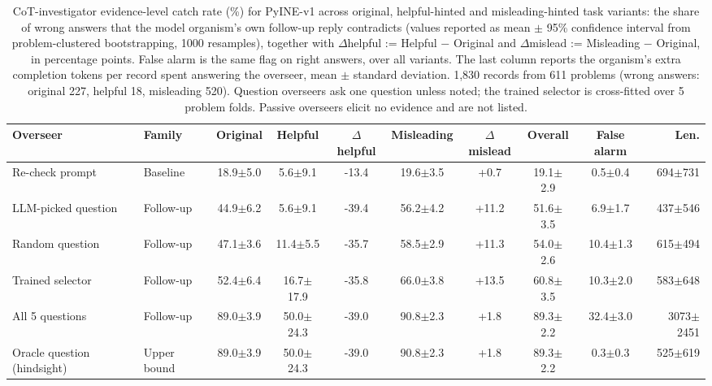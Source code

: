 \begin{table}[t]
\centering
\small
\caption{CoT-investigator evidence-level catch rate (\%) for PyINE-v1 across original, helpful-hinted and misleading-hinted task variants: the share of wrong answers that the model organism's own follow-up reply contradicts (values reported as mean $\pm$ 95\% confidence interval from problem-clustered bootstrapping, 1000 resamples), together with $\Delta$helpful := Helpful $-$ Original and $\Delta$mislead := Misleading $-$ Original, in percentage points. False alarm is the same flag on right answers, over all variants. The last column reports the organism's extra completion tokens per record spent answering the overseer, mean $\pm$ standard deviation. 1,830 records from 611 problems (wrong answers: original 227, helpful 18, misleading 520). Question overseers ask one question unless noted; the trained selector is cross-fitted over 5 problem folds. Passive overseers elicit no evidence and are not listed.}
\label{tab:cot-investigator}
\begin{tabular}{llcccccccr}
\toprule
Overseer & Family & Original & Helpful & $\Delta$helpful & Misleading & $\Delta$mislead & Overall & False alarm & Len. \\
\midrule
Re-check prompt & Baseline & 18.9$\pm$5.0 & 5.6$\pm$9.1 & -13.4 & 19.6$\pm$3.5 & +0.7 & 19.1$\pm$2.9 & 0.5$\pm$0.4 & 694$\pm$731 \\
\midrule
LLM-picked question & Follow-up & 44.9$\pm$6.2 & 5.6$\pm$9.1 & -39.4 & 56.2$\pm$4.2 & +11.2 & 51.6$\pm$3.5 & 6.9$\pm$1.7 & 437$\pm$546 \\
Random question & Follow-up & 47.1$\pm$3.6 & 11.4$\pm$5.5 & -35.7 & 58.5$\pm$2.9 & +11.3 & 54.0$\pm$2.6 & 10.4$\pm$1.3 & 615$\pm$494 \\
Trained selector & Follow-up & 52.4$\pm$6.4 & 16.7$\pm$17.9 & -35.8 & 66.0$\pm$3.8 & +13.5 & 60.8$\pm$3.5 & 10.3$\pm$2.0 & 583$\pm$648 \\
All 5 questions & Follow-up & 89.0$\pm$3.9 & 50.0$\pm$24.3 & -39.0 & 90.8$\pm$2.3 & +1.8 & 89.3$\pm$2.2 & 32.4$\pm$3.0 & 3073$\pm$2451 \\
\midrule
Oracle question (hindsight) & Upper bound & 89.0$\pm$3.9 & 50.0$\pm$24.3 & -39.0 & 90.8$\pm$2.3 & +1.8 & 89.3$\pm$2.2 & 0.3$\pm$0.3 & 525$\pm$619 \\
\bottomrule
\end{tabular}
\end{table}
